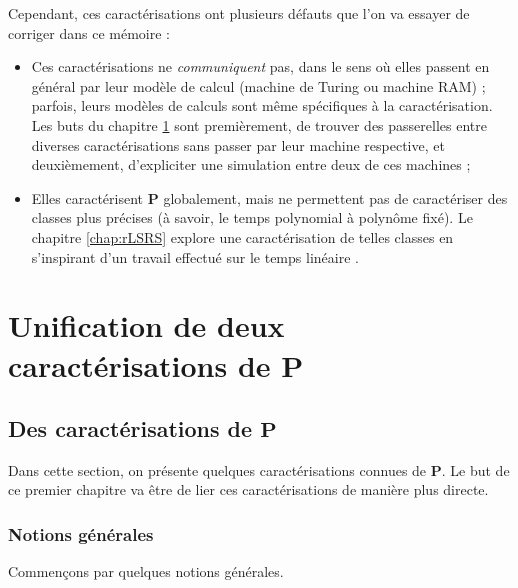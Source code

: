 \documentclass{report}
\begin{document}
	Cependant, ces caractérisations ont plusieurs défauts que l'on va essayer de corriger dans ce mémoire :
	
	\begin{itemize}
		\item 
				Ces caractérisations ne \emph{communiquent} pas, dans le sens où elles passent en général par leur modèle de calcul (machine de Turing ou machine RAM) ; parfois, leurs modèles de calculs sont même spécifiques à la caractérisation. Les buts du chapitre \ref{chap:unif_P} sont premièrement, de trouver des passerelles entre diverses caractérisations sans passer par leur machine respective, et deuxièmement, d'expliciter une simulation entre deux de ces machines ;
				
		\item 
				Elles caractérisent $\textbf{P}$ globalement, mais ne permettent pas de caractériser des classes plus précises (à savoir, le temps polynomial à polynôme fixé). Le chapitre \ref{chap:rLSRS} explore une caractérisation de telles classes en s'inspirant d'un travail effectué sur le temps linéaire \cite{GrandjeanSchwentick2002}.
	\end{itemize}
	
	
	\pagebreak
	
	\chapter{Unification de deux caractérisations de $\textbf{P}$}
	\label{chap:unif_P}
	
	\section{Des caractérisations de $\textbf{P}$}
		\label{sec:caracterisations_P}
	
		Dans cette section, on présente quelques caractérisations connues de $\textbf{P}$. Le but de ce premier chapitre va être de lier ces caractérisations de manière plus directe. 
	
		\subsection{Notions générales}
			\label{subsec:notions_generales}
		
			Commençons par quelques notions générales.
	
\end{document}
